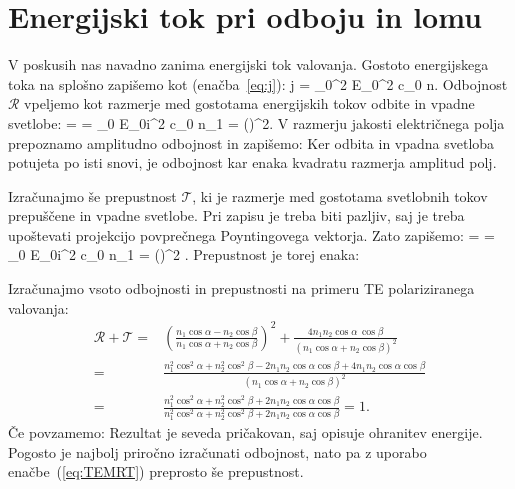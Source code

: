 \section{Energijski tok pri odboju in lomu}
V poskusih nas navadno zanima energijski tok valovanja. Gostoto energijskega
toka na splošno zapišemo kot (enačba~\ref{eq:j}):
\beq
j =  \varepsilon_0^2 E_0^2 c_0 n.
\label{eq:04_44}
\eeq
Odbojnost $\mathcal{R}$ vpeljemo kot razmerje med gostotama energijskih
tokov odbite in vpadne svetlobe:
\beq
{} =  = 
{\varepsilon_0 E_{0i}^2 c_0 n_1} = \left(\right)^2\!\!.
\label{eq:04_45}
\eeq
V razmerju jakosti električnega polja prepoznamo amplitudno odbojnost in zapišemo:
Ker odbita in vpadna svetloba potujeta po isti snovi, je odbojnost kar 
enaka kvadratu razmerja amplitud polj. 

Izračunajmo še prepustnost $\mathcal{T}$, ki je razmerje med gostotama svetlobnih
tokov prepuščene in vpadne svetlobe. Pri zapisu je treba biti pazljiv, saj je 
treba upoštevati projekcijo povprečnega Poyntingovega vektorja. Zato zapišemo: 
\beq
{} =  = 
{\varepsilon_0 E_{0i}^2 c_0 n_1} \frac{\cos\beta}{\cos\alpha}= 
\left(\right)^2 .
\label{eq:04_46}
\eeq
Prepustnost je torej enaka:

Izračunajmo vsoto odbojnosti in prepustnosti na primeru TE polariziranega valovanja:
\begin{align}
\mathcal{R}+ \mathcal{T}=&
\left(\frac{n_1 \cos \alpha - n_2 \cos \beta}{n_1 \cos \alpha + n_2 \cos \beta}\right)^2+
\frac{4n_1n_2\cos \alpha \, \cos \beta}{\left(n_1 \cos \alpha + n_2 \cos \beta\right)^2}\\ =& 
\frac{n_1^2 \cos^2\alpha + n_2^2\cos^2\beta -2 n_1n_2 \cos \alpha \cos \beta + 
4n_1n_2\cos\alpha \cos \beta}{\left(n_1 \cos \alpha + n_2 \cos \beta\right)^2}\\ = &
\frac{n_1^2 \cos^2\alpha + n_2^2\cos^2\beta +2 n_1n_2 \cos \alpha \cos \beta}
{n_1^2 \cos^2\alpha + n_2^2\cos^2\beta +2 n_1n_2 
\cos \alpha \cos \beta} = 1.
\label{eq:04_47}
\end{align}
Če povzamemo:
Rezultat je seveda pričakovan, saj opisuje ohranitev energije. Pogosto je najbolj
priročno izračunati odbojnost, nato pa z uporabo enačbe~(\ref{eq:TEMRT})
preprosto še prepustnost. 

